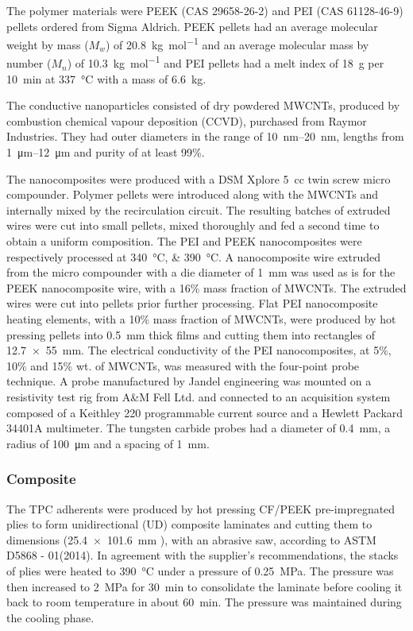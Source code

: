 \documentclass[11pt,review,times]{elsarticle}
\begin{document}
The polymer materials were PEEK (CAS 29658-26-2) and PEI (CAS 61128-46-9) pellets ordered from Sigma Aldrich. 
PEEK pellets had an average molecular weight by mass ($M_w$) of \SI{20,8}{\kilo\gram\per\mol} and an average molecular mass by number ($M_n$) of \SI{10,3}{\kilo\gram\per\mol} and PEI pellets had a melt index of \SI{18}{\gram} per \SI{10}{\minute} at \SI{337}{\celsius} with a mass of \SI{6.6}{\kilogram}. 

The conductive nanoparticles consisted of dry powdered MWCNTs, produced by combustion chemical vapour deposition (CCVD), purchased from Raymor Industries. 
They had outer diameters in the range of \SIrange{10}{20}{\nano\metre}, lengths from \SIrange{1}{12}{\micro\metre} and purity of at least 99\%.

The nanocomposites were produced with a DSM Xplore \SI{5}{cc} twin screw micro compounder. 
Polymer pellets were introduced along with the MWCNTs and internally mixed by the recirculation circuit. 
The resulting batches of extruded wires were cut into small pellets, mixed thoroughly and fed a second time to obtain a uniform composition. 
The PEI and PEEK nanocomposites were respectively processed at \SIlist{340;390}{\celsius}. 
A nanocomposite wire extruded from the micro compounder with a die diameter of \SI{1}{\milli\metre} was used as is for the PEEK nanocomposite wire, with a 16\% mass fraction of MWCNTs. 
The extruded wires were cut into pellets prior further processing. 
Flat PEI nanocomposite heating elements, with a 10\% mass fraction of MWCNTs, were produced by hot pressing pellets into \SI{0.5}{\milli\metre} thick films and cutting them into rectangles of \SI{12.7 x 55}{\milli\metre}. 
The electrical conductivity of the PEI nanocomposites, at 5\%, 10\% and 15\% wt. of MWCNTs, was measured with the four-point probe technique. 
A probe manufactured by Jandel engineering was mounted on a resistivity test rig from A\&M Fell Ltd. and connected to an acquisition system composed of a Keithley 220 programmable current source and a Hewlett Packard 34401A multimeter. 
The tungsten carbide probes had a diameter of \SI{0.4}{\mm}, a radius of \SI{100}{\um} and a spacing of \SI{1}{\mm}. 

\subsubsection{Composite}

The TPC adherents were produced by hot pressing CF/PEEK pre-impregnated plies to form unidirectional (UD) composite laminates and cutting them to dimensions (\SI{25.4 x 101.6}{\milli\metre} ), with an abrasive saw, according to ASTM D5868 - 01(2014). 
In agreement with the supplier’s recommendations, the stacks of plies were heated to \SI{390}{\celsius} under a pressure of \SI{0.25}{\MPa}. 
The pressure was then increased to \SI{2}{\MPa} for \SI{30}{\minute} to consolidate the laminate before cooling it back to room temperature in about \SI{60}{\minute}. 
The pressure was maintained during the cooling phase. 
\end{document}

